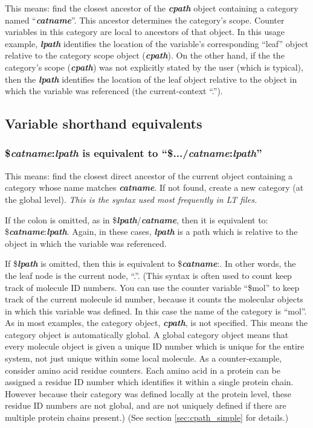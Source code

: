 \documentclass[11pt]{article}
\begin{document}
This means: find the closest ancestor of the \textit{\textbf{cpath}} object containing a category named ``\textit{\textbf{catname}}''.  This ancestor determines the category's scope.  Counter variables in this category are local to ancestors of that object.  In this usage example, \textit{\textbf{lpath}} identifies the location of the variable's corresponding ``leaf'' object
relative to the category scope object (\textit{\textbf{cpath}}).  
On the other hand, if the the category's scope (\textit{\textbf{cpath}})
was not explicitly stated by the user (which is typical), 
then the \textit{\textbf{lpath}} identifies the location of the leaf object relative to 
the object in which the variable was referenced 
(the current-context ``.'').

\subsection{Variable shorthand equivalents}
\label{sec:variables_shorthand}

\subsubsection*{\$\textit{\textbf{catname}}:\textit{\textbf{lpath}} is equivalent to ``\$.../\textit{\textbf{catname}}:\textit{\textbf{lpath}}''}
This means: find the closest direct ancestor of the current object containing a category whose name matches \textit{\textbf{catname}}.  If not found, create a new category (at the global level).  \textit{This is the syntax used most frequently in LT files.}

If the colon is omitted, as in \$\textit{\textbf{lpath}}/\textit{\textbf{catname}}, 
then it is equivalent to: \$\textit{\textbf{catname}}:\textit{\textbf{lpath}}.
Again, in these cases, \textit{\textbf{lpath}} is a path which is relative to the object
in which the variable was referenced.

If \$\textit{\textbf{lpath}} is omitted, then this is equivalent to \$\textit{\textbf{catname}}:.  In other words, the the leaf node is the current node, ``.''.  (This syntax is often used to count keep track of molecule ID numbers.  You can use the counter variable ``\$mol'' to keep track of the current molecule id number, because it counts the molecular objects in which this variable was defined.  In this case the name of the category is ``mol''.  As in most examples, the category object, \textit{\textbf{cpath}}, is not specified.  This means the category object is automatically global.  A global category object means that every molecule object is given a unique ID number which is unique for the entire system, not just unique within some local molecule.  As a counter-example, consider amino acid residue counters.  Each amino acid in a protein can be assigned a residue ID number which identifies it within a single protein chain.   However because their category was defined locally at the protein level, these residue ID numbers are not global, and are not uniquely defined if there are multiple protein chains present.)  (See section \ref{sec:cpath_simple} for details.)
\end{document}
